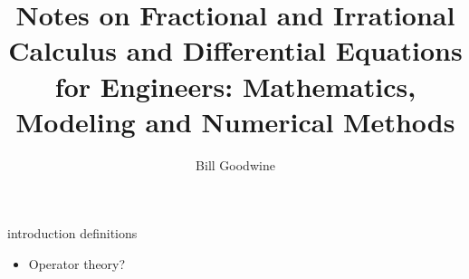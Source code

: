 \documentclass{book}
\title{Notes on Fractional and Irrational Calculus and Differential Equations for Engineers: Mathematics, Modeling and Numerical Methods}
\author{Bill Goodwine}
\begin{document}
\maketitle
\tableofcontents

{introduction}
{definitions}

\begin{itemize}
\item Operator theory?
\end{itemize}
\end{document}
